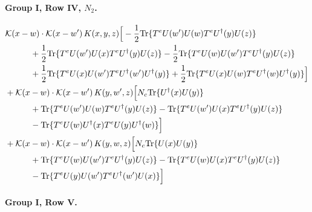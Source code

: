 \documentclass[10pt]{article}
\numberwithin{equation}{section}
\begin{document}
\paragraph{Group I, Row IV, $N_2$.}

\begin{align}
&\mathcal K(x-w)\cdot\mathcal K(x-w')\,K(x,y,z)\Big[-\frac{1}{2}{\rm Tr}\{T^eU(w')U(w)T^eU^\dagger(y)U(z)\}\notag\\
&\quad\quad\quad+\frac{1}{2}{\rm Tr}\{T^eU(w')U(x)T^eU^\dagger(y)U(z)\}-\frac{1}{2}{\rm Tr}\{T^eU(w)U(w')T^eU^\dagger(y)U(z)\}\notag\\
&\quad\quad\quad+\frac{1}{2}{\rm Tr}\{T^eU(x)U(w')T^eU^\dagger(w')U^\dagger(y)\}+\frac{1}{2}{\rm Tr}\{T^eU(x)U(w)T^eU^\dagger(w)U^\dagger(y)\}\Big]\notag\\
&+\mathcal K(x-w)\cdot\mathcal K(x-w')\,K(y,w',z)\Big[N_c{\rm Tr}\{U^\dagger(x)U(y)\}\notag\\
&\quad\quad\quad+{\rm Tr}\{T^eU(w')U(w)T^eU^\dagger(y)U(z)\}-{\rm Tr}\{T^eU(w')U(x)T^eU^\dagger(y)U(z)\}\notag\\
&\quad\quad\quad-{\rm Tr}\{T^eU(w)U^\dagger(x)T^eU(y)U^\dagger(w)\}\Big]\notag\\
&+\mathcal K(x-w)\cdot\mathcal K(x-w')\,K(y,w,z)\Big[N_c{\rm Tr}\{U(x)U(y)\}\notag\\
&\quad\quad\quad+{\rm Tr}\{T^eU(w)U(w')T^eU^\dagger(y)U(z)\}-{\rm Tr}\{T^eU(w)U(x)T^eU^\dagger(y)U(z)\}\notag\\
&\quad\quad\quad-{\rm Tr}\{T^eU(y)U(w')T^eU^\dagger(w')U(x)\}\Big]
\label{eq:list11}
\end{align}

\paragraph{Group I, Row V.}
\end{document}
